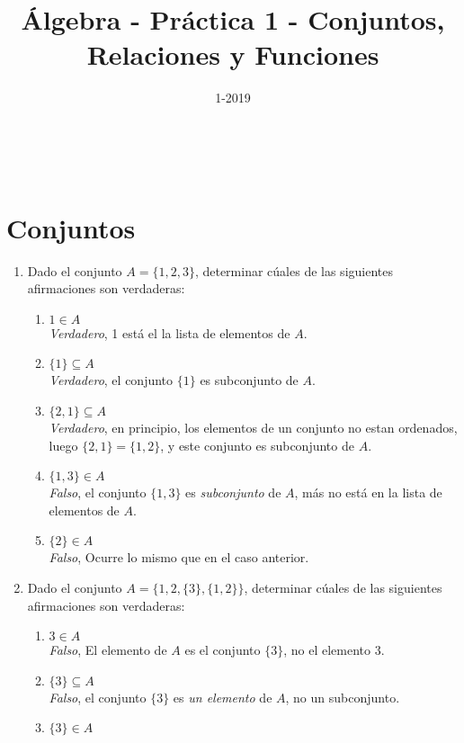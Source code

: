 \documentclass[a4paper,11pt]{article}
\title{Álgebra - Pr\'actica 1 - Conjuntos, Relaciones y Funciones}
\author{}
\date{1-2019}
\makeatletter
\renewcommand{\maketitle}{
\begin{center}
\begin{normalsize}\textbf{\@title}\end{normalsize}\\
\begin{normalsize}\@author\end{normalsize}
\end{center}
}
\makeatother
\begin{document}
\maketitle
\section*{Conjuntos}
    \begin{enumerate}
        \item Dado el conjunto $A=\{1,2,3\}$, determinar c\'uales de las siguientes afirmaciones son verdaderas:
        \begin{enumerate}[label = \roman*)]
            \item $1\in A$\\
                \textit{Verdadero}, 1 est\'a el la lista de elementos de $A$.
            \item $\{1\}\subseteq A$\\
                \textit{Verdadero}, el conjunto $\{1\}$ es subconjunto de $A$.
            \item $\{2,1\}\subseteq A$\\
                \textit{Verdadero}, en principio, los elementos de un conjunto no estan ordenados, luego $\{2,1\}=\{1,2\}$, y este conjunto es subconjunto de $A$.
            \item $\{1,3\}\in A$\\
                \textit{Falso}, el conjunto $\{1,3\}$ es \textit{subconjunto} de $A$, m\'as no est\'a en la lista de elementos de $A$.
            \item $\{2\}\in A$\\
                \textit{Falso}, Ocurre lo mismo que en el caso anterior.
        \end{enumerate}
        \item Dado el conjunto $A = \{1,2,\{3\},\{1,2\}\} $, determinar c\'uales de las siguientes afirmaciones son verdaderas:
        \begin{enumerate}[label = \roman*)]
            \item $3\in A$\\
                \textit{Falso}, El elemento de $A$ es el conjunto $\{3\}$, no el elemento $3$.
            \item $\{3\} \subseteq A$\\
                \textit{Falso}, el conjunto $\{3\}$ es \textit{un elemento} de $A$, no un subconjunto.
            \item $\{3\} \in A$\\

\end{enumerate}
\end{enumerate}
\end{document}
